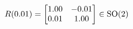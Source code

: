 \documentclass[preview]{standalone}
\begin{document}
\begin{align*}
\special{dvisvgm:raw <g id='unique000'>}R(0.01) = \begin{bmatrix} 1.00 & -0.01 \\ 0.01 & 1.00 \end{bmatrix} \in \text{SO}(2)\special{dvisvgm:raw </g>}
\end{align*}
\end{document}
